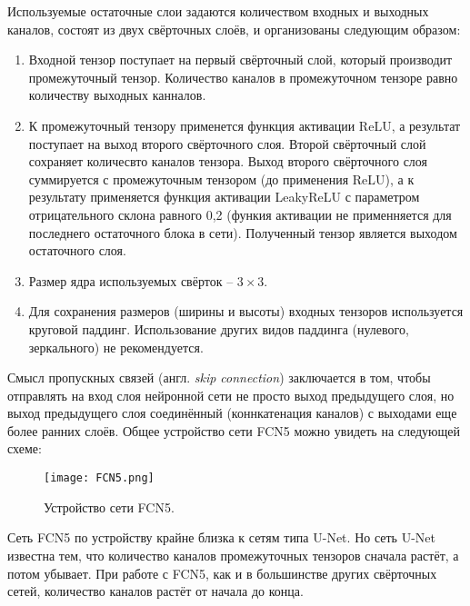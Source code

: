 Используемые остаточные слои задаются количеством входных и выходных каналов, состоят из двух свёрточных слоёв, и организованы следующим образом:
\begin{enumerate}
\item Входной тензор поступает на первый свёрточный слой, который производит промежуточный тензор. Количество каналов в промежуточном тензоре равно количеству выходных канналов.
\item К промежуточный тензору применется функция активации ReLU, а результат поступает на выход второго свёрточного слоя. Второй свёрточный слой сохраняет количесвто каналов тензора.
Выход второго свёрточного слоя суммируется с промежуточным тензором (до применения ReLU), а к результату применяется функция активации LeakyReLU с параметром отрицательного склона равного 0,2 (функия активации не применняется для последнего остаточного блока в сети). Полученный тензор является выходом остаточного слоя.
\item Размер ядра используемых свёрток -- $3\times3$.
\item Для сохранения размеров (ширины и высоты) входных тензоров используется круговой паддинг. Использование других видов паддинга (нулевого, зеркального) не рекомендуется.
\end{enumerate}

Смысл пропускных связей (англ. \textit{skip connection}) заключается в том, чтобы отправлять на вход слоя нейронной сети не просто выход предыдущего слоя, но выход предыдущего слоя соединённый (коннкатенация каналов) с выходами еще более ранних слоёв. Общее устройство сети FCN5 можно увидеть на следующей схеме:
\begin{figure}[H]
	\centering
	\texttt{[image: FCN5.png]}
	\caption{Устройство сети FCN5.}
	\label{fig_fcn5}
\end{figure}

Сеть FCN5 по устройству крайне близка к сетям типа U-Net\cite{unet}. Но сеть U-Net известна тем, что количество каналов промежуточных тензоров сначала растёт, а потом убывает. При работе с FCN5, как и в большинстве других свёрточных сетей, количество каналов растёт от начала до конца.

